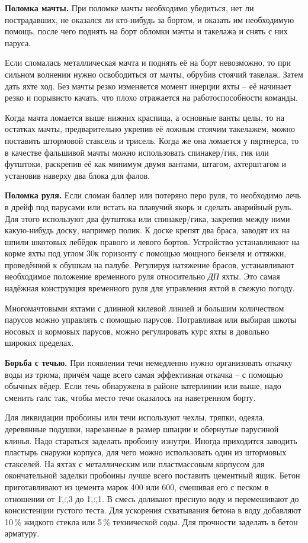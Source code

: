 \textbf{Поломка мачты.} При поломке мачты необходимо убедиться, нет ли пострадавших, не оказался ли кто-нибудь за бортом, и оказать им необходимую помощь, после чего поднять на борт обломки мачты и такелажа и снять с них паруса.

Если сломалась металлическая мачта и поднять её на борт невозможно, то при сильном волнении нужно освободиться от мачты, обрубив стоячий такелаж. Затем дать яхте ход. Без мачты резко изменяется момент инерции яхты \--- её начинает резко и порывисто качать, что плохо отражается на работоспособности команды.

Когда мачта ломается выше нижних краспица, а основные ванты целы, то на остатках мачты, предварительно укрепив её ложным стоячим такелажем, можно поставить штормовой стаксель и трисель. Когда же она ломается у пяртнерса, то в качестве фальшивой мачты можно использовать спинакер\-/гик, гик или футштоки, раскрепив её как минимум двумя вантами, штагом, ахтерштагом и установив наверху два блока для фалов.

\textbf{Поломка руля.} Если сломан баллер или потеряно перо руля, то необходимо лечь в дрейф под парусами или встать на плавучий якорь и сделать аварийный руль. Для этого используют два футштока или спинакер\-/гика, закрепив между ними какую-нибудь доску, например полик. К доске крепят два браса, заводят их на шпили шкотовых лебёдок правого и левого бортов. Устройство устанавливают на корме яхты под углом 30\gr к горизонту с помощью мощного бензеля и оттяжки, проведённой к обушкам на палубе. Регулируя натяжение брасов, устанавливают необходимое положение временного руля относительно \textit{ДП} яхты. Это самая надёжная конструкция временного руля для управления яхтой в свежую погоду.

Многомачтовыми яхтами с длинной килевой линией и большим количеством парусов можно управлять с помощью парусов. Потравливая или выбирая шкоты носовых и кормовых парусов, можно регулировать курс яхты в довольно широких пределах. 

\textbf{Борьба с течью.} При появлении течи немедленно нужно организовать откачку воды из трюма, причём чаще всего самая эффективная откачка \--- с помощью обычных вёдер. Если течь обнаружена в районе ватерлинии или выше, надо сменить галс так, чтобы место течи оказалось на наветренном борту.

Для ликвидации пробоины или течи используют чехлы, тряпки, одеяла, деревянные подушки, нарезанные в размер шпации и обернутые парусиной клинья. Надо стараться заделать пробоину изнутри. Иногда приходится заводить пластырь снаружи корпуса, для чего можно использовать один из штормовых стакселей. На яхтах с металлическим или пластмассовым корпусом для окончательной заделки пробоины лучше всего поставить цементный ящик. Бетон приготавливают из цемента марок 400 или 600, смешивая его с песком в отношении от 1\=,:\=,3 до 1\=,:\=,1. В смесь доливают пресную воду и перемешивают до консистенции густого теста. Для ускорения схватывания бетона в воду добавляют 10\,\% жидкого стекла или 5\,\% технической соды. Для прочности заделать в бетон арматуру. 

